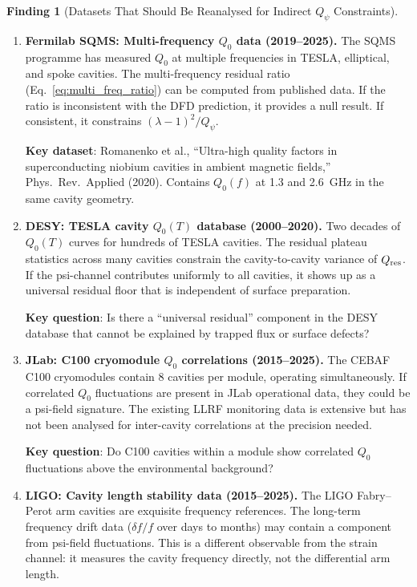 \documentclass[11pt]{article}
\newcommand{\lam}{\lambda}
\newcommand{\Qpsi}{Q_\psi}
\theoremstyle{definition}
\newtheorem{finding}[theorem]{Finding}
\theoremstyle{remark}
\begin{document}
\begin{finding}[Datasets That Should Be Reanalysed for Indirect $\Qpsi$ Constraints]
\label{find:datasets}

\begin{enumerate}[label=\textbf{D\arabic*.}, itemsep=6pt]

\item \textbf{Fermilab SQMS: Multi-frequency $Q_0$ data (2019--2025).}
  The SQMS programme has measured $Q_0$ at multiple frequencies in
  TESLA, elliptical, and spoke cavities. The multi-frequency residual
  ratio (Eq.~\ref{eq:multi_freq_ratio}) can be computed from
  published data. If the ratio is inconsistent with the DFD prediction,
  it provides a null result. If consistent, it constrains
  $(\lam-1)^2/\Qpsi$.

  \textbf{Key dataset}: Romanenko et al., ``Ultra-high quality factors
  in superconducting niobium cavities in ambient magnetic fields,''
  Phys.\ Rev.\ Applied (2020). Contains $Q_0(f)$ at 1.3 and 2.6~GHz
  in the same cavity geometry.

\item \textbf{DESY: TESLA cavity $Q_0(T)$ database (2000--2020).}
  Two decades of $Q_0(T)$ curves for hundreds of TESLA cavities.
  The residual plateau statistics across many cavities constrain the
  cavity-to-cavity variance of $Q_{\rm res}$. If the psi-channel
  contributes uniformly to all cavities, it shows up as a universal
  residual floor that is independent of surface preparation.

  \textbf{Key question}: Is there a ``universal residual'' component
  in the DESY database that cannot be explained by trapped flux or
  surface defects?

\item \textbf{JLab: C100 cryomodule $Q_0$ correlations (2015--2025).}
  The CEBAF C100 cryomodules contain 8 cavities per module, operating
  simultaneously. If correlated $Q_0$ fluctuations are present in
  JLab operational data, they could be a psi-field signature. The
  existing LLRF monitoring data is extensive but has not been
  analysed for inter-cavity correlations at the precision needed.

  \textbf{Key question}: Do C100 cavities within a module show
  correlated $Q_0$ fluctuations above the environmental background?

\item \textbf{LIGO: Cavity length stability data (2015--2025).}
  The LIGO Fabry--Perot arm cavities are exquisite frequency
  references. The long-term frequency drift data ($\delta f/f$ over
  days to months) may contain a component from psi-field fluctuations.
  This is a different observable from the strain channel: it measures
  the cavity frequency directly, not the differential arm length.


\end{enumerate}
\end{finding}
\end{document}
